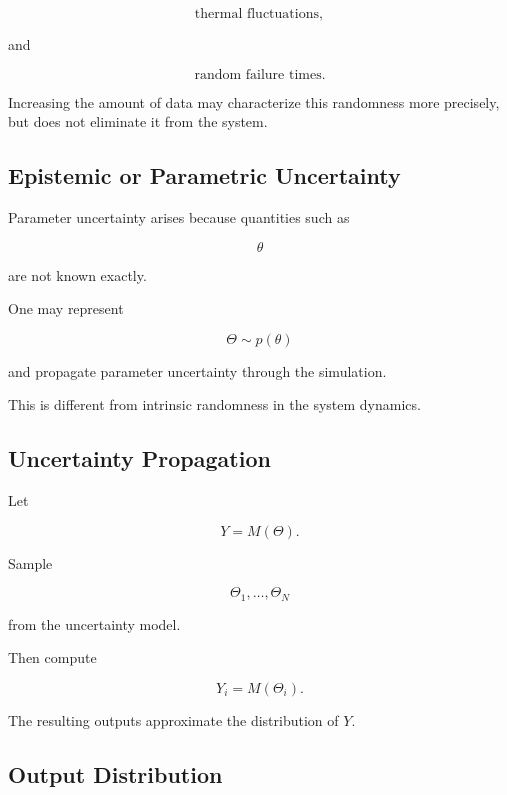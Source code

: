 \[
\boxed{
\text{thermal fluctuations},
}
\]

and

\[
\boxed{
\text{random failure times}.
}
\]

Increasing the amount of data may characterize this randomness more
precisely, but does not eliminate it from the system.

\subsection{Epistemic or Parametric Uncertainty}
\label{subsec:simulation-parametric-uncertainty}

Parameter uncertainty arises because quantities such as

\[
\theta
\]

are not known exactly.

One may represent

\[
\boxed{
\Theta
\sim p(\theta)
}
\]

and propagate parameter uncertainty through the simulation.

This is different from intrinsic randomness in the system dynamics.

\subsection{Uncertainty Propagation}
\label{subsec:simulation-uncertainty-propagation}

Let

\[
Y
=
M(\Theta).
\]

Sample

\[
\Theta_1,\ldots,\Theta_N
\]

from the uncertainty model.

Then compute

\[
\boxed{
Y_i
=
M(\Theta_i).
}
\]

The resulting outputs approximate the distribution of \(Y\).

\subsection{Output Distribution}
\label{subsec:simulation-output-distribution}

